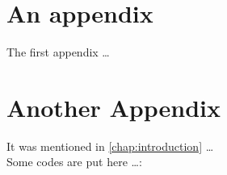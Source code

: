 \chapter{An appendix}
\label{chap:app1}
The first appendix \ldots

\chapter{Another Appendix}
\label{chap:app2}
It was mentioned in \cref{chap:introduction} \ldots \\
Some codes are put here \ldots:\\

